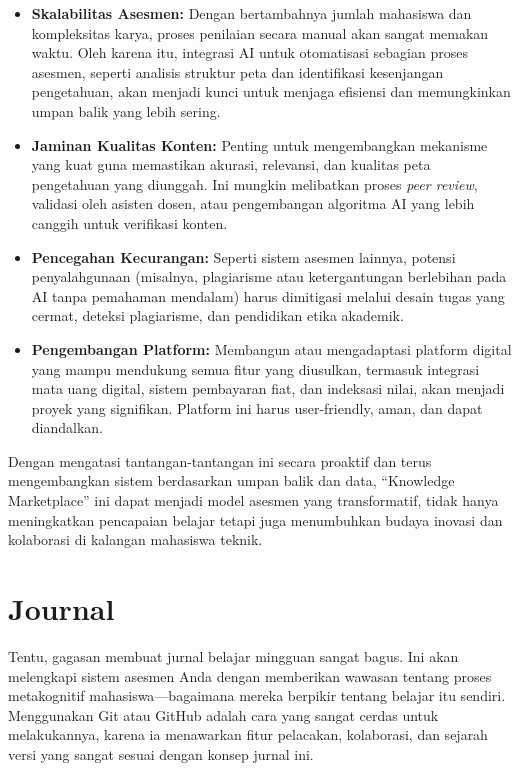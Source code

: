 \documentclass[
  letterpaper,
  DIV=11,
  numbers=noendperiod]{scrreprt}
\begin{document}
\begin{itemize}
\item
  \textbf{Skalabilitas Asesmen:} Dengan bertambahnya jumlah mahasiswa
  dan kompleksitas karya, proses penilaian secara manual akan sangat
  memakan waktu. Oleh karena itu, integrasi AI untuk otomatisasi
  sebagian proses asesmen, seperti analisis struktur peta dan
  identifikasi kesenjangan pengetahuan, akan menjadi kunci untuk menjaga
  efisiensi dan memungkinkan umpan balik yang lebih sering.
\item
  \textbf{Jaminan Kualitas Konten:} Penting untuk mengembangkan
  mekanisme yang kuat guna memastikan akurasi, relevansi, dan kualitas
  peta pengetahuan yang diunggah. Ini mungkin melibatkan proses
  \emph{peer review}, validasi oleh asisten dosen, atau pengembangan
  algoritma AI yang lebih canggih untuk verifikasi konten.
\item
  \textbf{Pencegahan Kecurangan:} Seperti sistem asesmen lainnya,
  potensi penyalahgunaan (misalnya, plagiarisme atau ketergantungan
  berlebihan pada AI tanpa pemahaman mendalam) harus dimitigasi melalui
  desain tugas yang cermat, deteksi plagiarisme, dan pendidikan etika
  akademik.
\item
  \textbf{Pengembangan Platform:} Membangun atau mengadaptasi platform
  digital yang mampu mendukung semua fitur yang diusulkan, termasuk
  integrasi mata uang digital, sistem pembayaran fiat, dan indeksasi
  nilai, akan menjadi proyek yang signifikan. Platform ini harus
  user-friendly, aman, dan dapat diandalkan.
\end{itemize}

Dengan mengatasi tantangan-tantangan ini secara proaktif dan terus
mengembangkan sistem berdasarkan umpan balik dan data, ``Knowledge
Marketplace'' ini dapat menjadi model asesmen yang transformatif, tidak
hanya meningkatkan pencapaian belajar tetapi juga menumbuhkan budaya
inovasi dan kolaborasi di kalangan mahasiswa teknik.


\chapter{Journal}\label{journal}

Tentu, gagasan membuat jurnal belajar mingguan sangat bagus. Ini akan
melengkapi sistem asesmen Anda dengan memberikan wawasan tentang proses
metakognitif mahasiswa---bagaimana mereka berpikir tentang belajar itu
sendiri. Menggunakan Git atau GitHub adalah cara yang sangat cerdas
untuk melakukannya, karena ia menawarkan fitur pelacakan, kolaborasi,
dan sejarah versi yang sangat sesuai dengan konsep jurnal ini.
\end{document}
